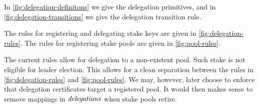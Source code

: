 In \cref{fig:delegation-definitons} we give the delegation primitives,
and in \cref{fig:delegation-transitions} we give the delegation transition rule.

The rules for registering and delegating stake keys are given in \cref{fig:delegation-rules}.
The rules for registering stake pools are given in \cref{fig:pool-rules}.

\begin{note}
  The current rules allow for delegation to a non-existent pool.
  Such stake is not eligible for leader election.
  This allows for a clean separation between the rules in
  \cref{fig:delegation-rules} and \cref{fig:pool-rules}.
  We may, however, later choose to enforce that delegation certificates
  target a registered pool.  It would then makes sense to remove
  mappings in $\mathit{delegations}$ when stake pools retire.
\end{note}

